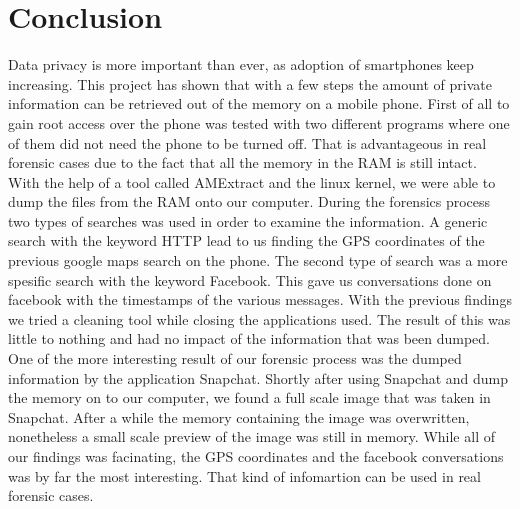 \section{Conclusion}
Data privacy is more important than ever, as adoption of smartphones keep increasing. This project has shown that with a few steps the amount of private information can be retrieved out of the memory on a mobile phone. First of all to gain root access over the phone was tested with two different programs where one of them did not need the phone to be turned off. That is advantageous in real forensic cases due to the fact that all the memory in the RAM is still intact. With the help of a tool called AMExtract and the linux kernel, we were able to dump the files from the RAM onto our computer. During the forensics process two types of searches was used in order to examine the information. A generic search with the keyword HTTP lead to us finding the GPS coordinates of the previous google maps search on the phone. The second type of search was a more spesific search with the keyword Facebook. This gave us conversations done on facebook with the timestamps of the various messages. With the previous findings we tried a cleaning tool while closing the applications used. The result of this was little to nothing and had no impact of the information that was been dumped. One of the more interesting result of our forensic process was the dumped information by the application Snapchat. Shortly after using Snapchat and dump the memory on to our computer, we found a full scale image that was taken in Snapchat. After a while the memory containing the image was overwritten, nonetheless a small scale preview of the image was still in memory. While all of our findings was facinating, the GPS coordinates and the facebook conversations was by far the most interesting. That kind of infomartion can be used in real forensic cases.